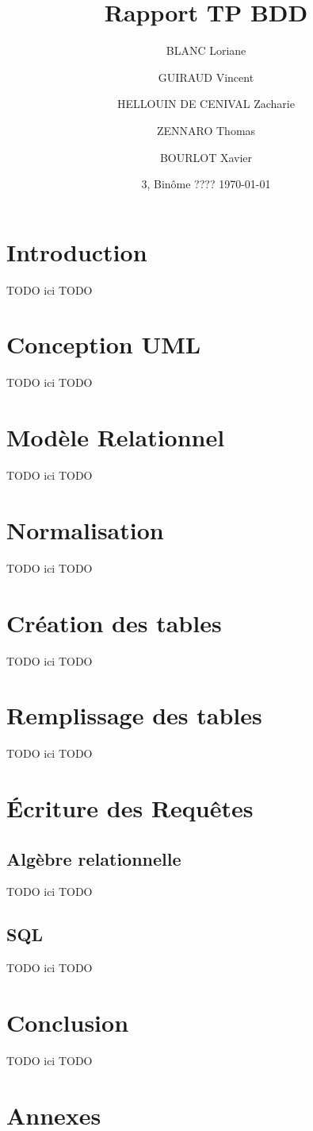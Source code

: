 \documentclass[french]{article}
\title{Rapport TP BDD}
\author{ BLANC Loriane \and GUIRAUD Vincent \and HELLOUIN DE CENIVAL Zacharie \and ZENNARO Thomas \and  BOURLOT Xavier}
\date{3\bsc{Imacs-ae-c}, Binôme ???? \bigbreak \today}
\begin{document}
\maketitle

\tableofcontents

\newpage

\section{Introduction}
TODO ici TODO
\section{Conception UML}
TODO ici TODO
\section{Modèle Relationnel}
TODO ici TODO
\section{Normalisation}
TODO ici TODO
\section{Création des tables}
TODO ici TODO
\section{Remplissage des tables}
TODO ici TODO
\section{Écriture des Requêtes}
\subsection{Algèbre relationnelle}
TODO ici TODO
\subsection{SQL}
TODO ici TODO
\section{Conclusion}
TODO ici TODO

\newpage
\appendix
\section{Annexes}
\end{document}
